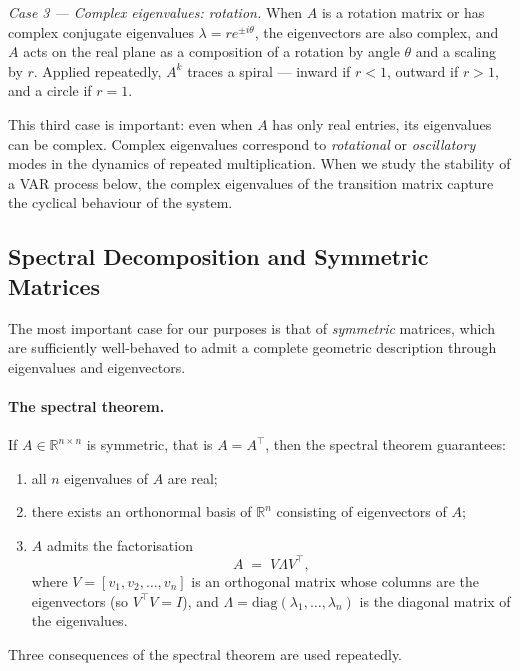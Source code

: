 \documentclass[11pt, a4paper, oneside]{article}
\begin{document}
\emph{Case 3 — Complex eigenvalues: rotation.} When $A$ is a rotation
matrix or has complex conjugate eigenvalues $\lambda = r e^{\pm i\theta}$,
the eigenvectors are also complex, and $A$ acts on the real plane as
a composition of a rotation by angle $\theta$ and a scaling by $r$.
Applied repeatedly, $A^k$ traces a spiral — inward if $r < 1$,
outward if $r > 1$, and a circle if $r = 1$.

This third case is important: even when $A$ has only real entries,
its eigenvalues can be complex. Complex eigenvalues correspond to
\emph{rotational} or \emph{oscillatory} modes in the dynamics of
repeated multiplication. When we study the stability of a VAR process
below, the complex eigenvalues of the transition matrix capture the
cyclical behaviour of the system.

\subsection{Spectral Decomposition and Symmetric Matrices}

The most important case for our purposes is that of \emph{symmetric}
matrices, which are sufficiently well-behaved to admit a complete
geometric description through eigenvalues and eigenvectors.

\paragraph{The spectral theorem.}
If $A \in \mathbb{R}^{n \times n}$ is symmetric, that is
$A = A^{\top}$, then the spectral theorem guarantees:
\begin{enumerate}[leftmargin=1.5em, itemsep=3pt]
    \item all $n$ eigenvalues of $A$ are real;
    \item there exists an orthonormal basis of $\mathbb{R}^n$
          consisting of eigenvectors of $A$;
    \item $A$ admits the factorisation
          \begin{equation}
          A \;=\; V \Lambda V^{\top},
          \label{eq:spectral-decomposition}
          \end{equation}
          where $V = [v_1, v_2, \ldots, v_n]$ is an orthogonal matrix
          whose columns are the eigenvectors (so $V^{\top} V = I$),
          and $\Lambda = \mathrm{diag}(\lambda_1, \ldots, \lambda_n)$
          is the diagonal matrix of the eigenvalues.
\end{enumerate}
Three consequences of the spectral theorem are used repeatedly.
\end{document}
